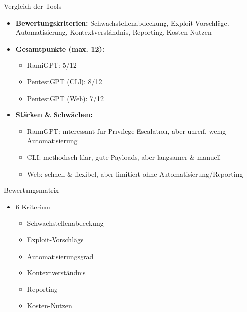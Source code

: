 \documentclass[
	aspectratio=169,	%
	onlytextwidth,		%
	t,					%
	]{beamer}
\begin{document}
\begin{frame}{Vergleich der Tools}
	\begin{itemize}
		\item \textbf{Bewertungskriterien:}  
		Schwachstellenabdeckung, Exploit-Vorschläge, Automatisierung, Kontextverständnis, Reporting, Kosten-Nutzen
		
		\item \textbf{Gesamtpunkte (max. 12):}
		\begin{itemize}
			\item RamiGPT: 5/12
			\item PentestGPT (CLI): 8/12
			\item PentestGPT (Web): 7/12
		\end{itemize}
		
		\item \textbf{Stärken \& Schwächen:}
		\begin{itemize}
			\item RamiGPT: interessant für Privilege Escalation, aber unreif, wenig Automatisierung
			\item CLI: methodisch klar, gute Payloads, aber langsamer \& manuell
			\item Web: schnell \& flexibel, aber limitiert ohne Automatisierung/Reporting
		\end{itemize}
	\end{itemize}
\end{frame}


\begin{frame}{Bewertungsmatrix}
	\begin{itemize}
		\item 6 Kriterien:
		\begin{itemize}
			\item Schwachstellenabdeckung
			\item Exploit-Vorschläge
			\item Automatisierungsgrad
			\item Kontextverständnis
			\item Reporting
			\item Kosten-Nutzen
		\end{itemize}
	\end{itemize}
\end{frame}
\end{document}
